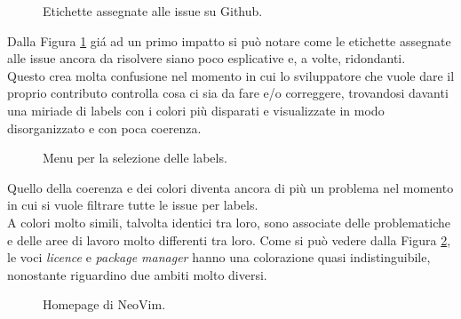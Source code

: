 \documentclass[12pt]{article} %
\begin{document}
\begin{figure}[H] 
\caption{Etichette assegnate alle issue su Github.}
\label{fig:cattivoesempio1}
\end{figure}

Dalla Figura \ref{fig:cattivoesempio1} gi\'a ad un primo impatto si può notare come le etichette assegnate alle issue ancora da risolvere siano poco esplicative e, a volte, ridondanti.\\
Questo crea molta confusione nel momento in cui lo sviluppatore che vuole dare il proprio contributo controlla cosa ci sia da fare e/o correggere, trovandosi davanti una miriade di labels con i colori più disparati e visualizzate in modo disorganizzato e con poca coerenza.

\begin{figure}[H] 
\caption{Menu per la selezione delle labels.}
\label{fig:cattivoesempio2}
\end{figure}

Quello della coerenza e dei colori diventa ancora di più un problema nel momento in cui si vuole filtrare tutte le issue per labels.\\
A colori molto simili, talvolta identici tra loro, sono associate delle problematiche e delle aree di lavoro molto differenti tra loro. Come si pu\`o vedere dalla Figura \ref{fig:cattivoesempio2}, le voci \emph{licence} e \emph{package manager} hanno una colorazione quasi indistinguibile, nonostante riguardino due ambiti molto diversi.

\begin{figure}[H] 
\caption{Homepage di NeoVim.}
\label{fig:cattivoesempio3}
\end{figure}
\end{document}

